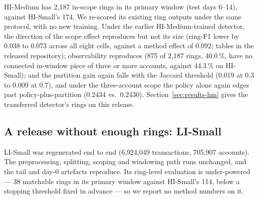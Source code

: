 HI-Medium has 2{,}187 in-scope rings in its primary window (test days 6--14), against
HI-Small's 174. We re-scored its existing ring outputs under the same protocol, with no new
training.
Under the earlier HI-Medium-trained detector, the direction of the scope effect reproduces but
not its size (ring-F1 lower by 0.038 to 0.073 across all eight cells, against a method effect of
0.092; tables in the released repository); observability reproduces (875 of 2{,}187 rings,
40.0\,\%, have no connected in-window piece of three or more accounts, against 44.3\,\% on
HI-Small); and the partition gain again falls with the Jaccard threshold (0.019 at 0.3 to 0.009
at 0.7), and under the three-account scope the policy alone again edges past
policy-plus-partition (0.2434 vs.\ 0.2430). Section~\ref{sec:results-hm} gives the transferred detector's rings on this release.

\subsection{A release without enough rings: LI-Small}

LI-Small was regenerated end to end (6{,}924{,}049 transactions, 705{,}907 accounts). The
preprocessing, splitting, scoping and windowing path runs unchanged, and the tail and day-0
artefacts reproduce. Its ring-level evaluation is under-powered --- 38 matchable rings in its
primary window against HI-Small's 114, below a stopping threshold fixed in advance --- so we
report no method numbers on it.
